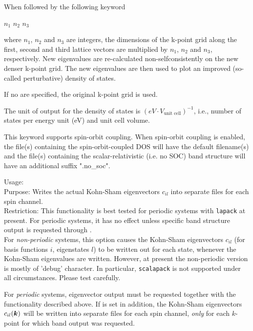 When followed by the following keyword

  $n_1$  $n_2$  $n_3$

where $n_1$, $n_2$ and $n_3$ are integers, the dimensions of the k-point grid along
the first, second and third lattice vectors are multiplied by $n_1$, $n_2$ and $n_3$,
 respectively. New eigenvalues are re-calculated
non-selfconsistently on the new denser k-point grid. The new eigenvalues are
then used to plot an improved (so-called perturbative) density of states.

If no  are specified, the original k-point grid is used.

The unit of output for the density of states is $(eV \cdot
V_\text{unit cell})^{-1}$, i.e., number of states per energy unit (eV)
and unit cell volume.

This keyword supports spin-orbit coupling.  When spin-orbit coupling is
enabled, the file(s) containing the spin-orbit-coupled DOS will have the
default filename(s) and the file(s) containing the scalar-relativistic
(i.e. no SOC) band structure will have an additional suffix ".no\_soc".

{
  \noindent
  Usage:   \\[1.0ex]
  Purpose: Writes the actual Kohn-Sham eigenvectors $c_{il}$ into
    separate files for each spin channel. \\[1.0ex]
  Restriction: This functionality is best tested for periodic systems
  with  \texttt{lapack} at present. For periodic systems,
  it has no effect unless specific band structure output is requested through
   . \\[1.0ex]
}
For \emph{non-periodic} systems, this option causes the Kohn-Sham eigenvectors
$c_{il}$ (for basis functions $i$, eigenstates $l$) to be written out for each
  state, whenever the Kohn-Sham eigenvalues
are written. However, at present the non-periodic version is mostly of 'debug'
character. In particular,  \texttt{scalapack} is not
supported under all circumstances. Please test carefully.

For \emph{periodic} systems, eigenvector output must be requested together
with the   functionality described
above. If   is set in
addition, the Kohn-Sham eigenvectors $c_{il}(\mbox{\boldmath$k$})$ will be
written into separate files for each spin channel, \emph{only} for each
$k$-point for which band output was requested.

